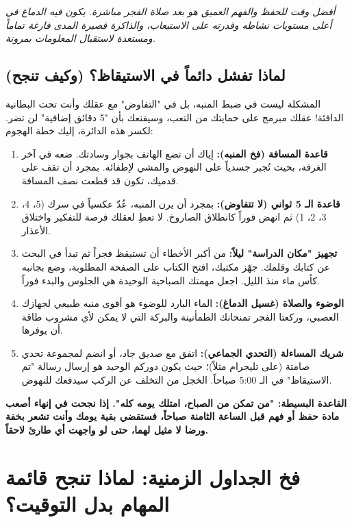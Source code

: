 \documentclass[12pt,a4paper]{book}
\newcommand{\quoteAr}[1]{%
	\begin{myquote}
		\itshape #1
	\end{myquote}
}
\newcommand{\importantAr}[1]{%
	\begin{important}
		\bfseries #1
	\end{important}
}
\begin{document}
	\quoteAr{أفضل وقت للحفظ والفهم العميق هو بعد صلاة الفجر مباشرة. يكون فيه الدماغ في أعلى مستويات نشاطه وقدرته على الاستيعاب، والذاكرة قصيرة المدى فارغة تماماً ومستعدة لاستقبال المعلومات بمرونة.}
	
	\subsection{لماذا تفشل دائماً في الاستيقاظ؟ (وكيف تنجح)}
	المشكلة ليست في ضبط المنبه، بل في "التفاوض" مع عقلك وأنت تحت البطانية الدافئة! عقلك مبرمج على حمايتك من التعب، وسيقنعك بأن   \newline
	"5 دقائق إضافية" لن تضر. لكسر هذه الدائرة، إليك خطة الهجوم:
	
	\begin{enumerate}
		\item \textbf{قاعدة المسافة (فخ المنبه):} إياك أن تضع الهاتف بجوار وسادتك. ضعه في آخر الغرفة، بحيث تُجبر جسدياً على النهوض والمشي لإطفائه. بمجرد أن تقف على قدميك، تكون قد قطعت نصف المسافة.
		\item \textbf{قاعدة الـ 5 ثواني (لا تتفاوض):} بمجرد أن يرن المنبه، عُدّ عكسياً في سرك (5، 4، 3، 2، 1) ثم انهض فوراً كانطلاق الصاروخ. لا تعطِ لعقلك فرصة للتفكير واختلاق الأعذار.
		\item \textbf{تجهيز "مكان الدراسة" ليلاً:} من أكبر الأخطاء أن تستيقظ فجراً ثم تبدأ في البحث عن كتابك وقلمك. جهّز مكتبك، افتح الكتاب على الصفحة المطلوبة، وضع بجانبه كأس ماء منذ الليل. اجعل مهمتك الصباحية الوحيدة هي الجلوس والبدء فوراً.
		\item \textbf{الوضوء والصلاة (غسيل الدماغ):} الماء البارد للوضوء هو أقوى منبه طبيعي لجهازك العصبي، وركعتا الفجر تمنحانك الطمأنينة والبركة التي لا يمكن لأي مشروب طاقة أن يوفرها.
		\item \textbf{شريك المساءلة (التحدي الجماعي):} اتفق مع صديق جاد، أو انضم لمجموعة تحدي صامتة (على تليجرام مثلاً)؛ حيث يكون دوركم الوحيد هو إرسال رسالة "تم الاستيقاظ" في الـ 5:00 صباحاً. الخجل من التخلف عن الركب سيدفعك للنهوض.
	\end{enumerate}
	
	\importantAr{القاعدة البسيطة: "من تمكن من الصباح، امتلك يومه كله". إذا نجحت في إنهاء أصعب مادة حفظ أو فهم قبل الساعة الثامنة صباحاً، فستقضي بقية يومك وأنت تشعر بخفة ورضا لا مثيل لهما، حتى لو واجهت أي طارئ لاحقاً.}
	
\section{فخ الجداول الزمنية: لماذا تنجح قائمة المهام بدل التوقيت؟}
\label{sec:owner-experiences8}
\end{document}
